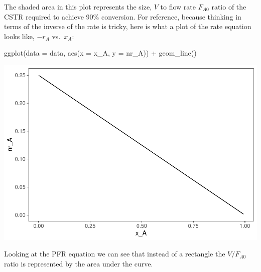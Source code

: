 \documentclass[
]{article}
\newenvironment{Shaded}{\begin{snugshade}}{\end{snugshade}}
\newcommand{\AttributeTok}[1]{\textcolor[rgb]{0.77,0.63,0.00}{#1}}
\newcommand{\FunctionTok}[1]{\textcolor[rgb]{0.00,0.00,0.00}{#1}}
\newcommand{\NormalTok}[1]{#1}
\newcommand{\SpecialCharTok}[1]{\textcolor[rgb]{0.00,0.00,0.00}{#1}}
\begin{document}
The shaded area in this plot represents the size, \(V\) to flow rate \(F_{A0}\) ratio of the CSTR required to achieve 90\% conversion.
For reference, because thinking in terms of the inverse of the rate is tricky, here is what a plot of the rate equation looks like, \(-r_A\) vs.~\(x_A\):

\begin{Shaded}
\begin{Highlighting}[]
\FunctionTok{ggplot}\NormalTok{(}\AttributeTok{data =}\NormalTok{ data, }\FunctionTok{aes}\NormalTok{(}\AttributeTok{x =}\NormalTok{ x\_A, }\AttributeTok{y =}\NormalTok{ nr\_A)) }\SpecialCharTok{+} \FunctionTok{geom\_line}\NormalTok{()}
\end{Highlighting}
\end{Shaded}

\includegraphics{Bioprocess_Engineering_files/figure-latex/unnamed-chunk-16-1.pdf}

Looking at the PFR equation we can see that instead of a rectangle the \(V/F_{A0}\) ratio is represented by the area under the curve.
\end{document}

